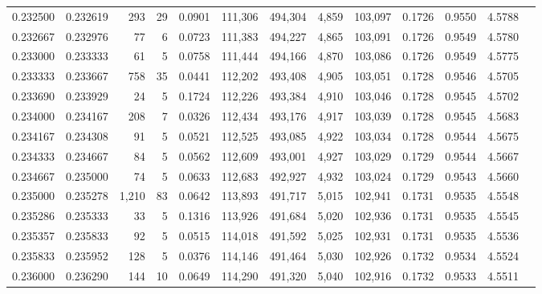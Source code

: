 \begin{tabular}{rrrrrrrrrrrrr}
0.232500 & 0.232619 &   293 &  29 &                                     0.0901 & 111,306 & 494,304 &   4,859 & 103,097 & 0.1726 & 0.9550 & 4.5788 \\
0.232667 & 0.232976 &    77 &   6 &                                     0.0723 & 111,383 & 494,227 &   4,865 & 103,091 & 0.1726 & 0.9549 & 4.5780 \\
0.233000 & 0.233333 &    61 &   5 &                                     0.0758 & 111,444 & 494,166 &   4,870 & 103,086 & 0.1726 & 0.9549 & 4.5775 \\
0.233333 & 0.233667 &   758 &  35 &                                     0.0441 & 112,202 & 493,408 &   4,905 & 103,051 & 0.1728 & 0.9546 & 4.5705 \\
0.233690 & 0.233929 &    24 &   5 &                                     0.1724 & 112,226 & 493,384 &   4,910 & 103,046 & 0.1728 & 0.9545 & 4.5702 \\
0.234000 & 0.234167 &   208 &   7 &                                     0.0326 & 112,434 & 493,176 &   4,917 & 103,039 & 0.1728 & 0.9545 & 4.5683 \\
0.234167 & 0.234308 &    91 &   5 &                                     0.0521 & 112,525 & 493,085 &   4,922 & 103,034 & 0.1728 & 0.9544 & 4.5675 \\
0.234333 & 0.234667 &    84 &   5 &                                     0.0562 & 112,609 & 493,001 &   4,927 & 103,029 & 0.1729 & 0.9544 & 4.5667 \\
0.234667 & 0.235000 &    74 &   5 &                                     0.0633 & 112,683 & 492,927 &   4,932 & 103,024 & 0.1729 & 0.9543 & 4.5660 \\
0.235000 & 0.235278 & 1,210 &  83 &                                     0.0642 & 113,893 & 491,717 &   5,015 & 102,941 & 0.1731 & 0.9535 & 4.5548 \\
0.235286 & 0.235333 &    33 &   5 &                                     0.1316 & 113,926 & 491,684 &   5,020 & 102,936 & 0.1731 & 0.9535 & 4.5545 \\
0.235357 & 0.235833 &    92 &   5 &                                     0.0515 & 114,018 & 491,592 &   5,025 & 102,931 & 0.1731 & 0.9535 & 4.5536 \\
0.235833 & 0.235952 &   128 &   5 &                                     0.0376 & 114,146 & 491,464 &   5,030 & 102,926 & 0.1732 & 0.9534 & 4.5524 \\
0.236000 & 0.236290 &   144 &  10 &                                     0.0649 & 114,290 & 491,320 &   5,040 & 102,916 & 0.1732 & 0.9533 & 4.5511 \\

\end{tabular}
